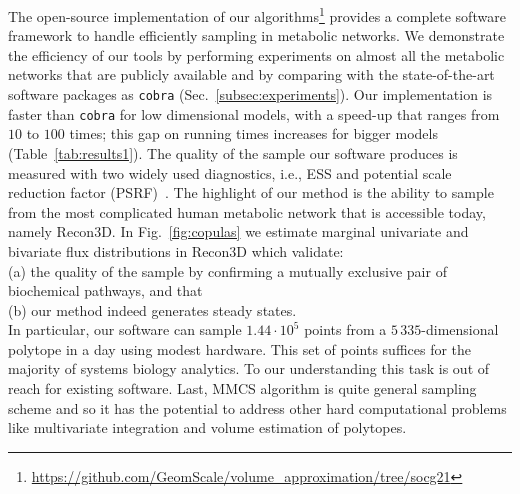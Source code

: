    The open-source implementation of our algorithms\footnote{\url{https://github.com/GeomScale/volume_approximation/tree/socg21}} provides a
   complete software framework to handle efficiently sampling in metabolic
   networks. We demonstrate the efficiency of our tools by performing experiments
   on almost all the metabolic networks that are publicly available and by
   comparing with the
   state-of-the-art software packages as \texttt{cobra}
   (Sec.~\ref{subsec:experiments}). Our implementation is faster than \texttt{cobra}
   for low dimensional models,  with a speed-up that ranges from $10$ to $100$ times;
   this gap on running times increases for bigger models
   (Table~\ref{tab:results1}). The quality of the sample our software produces is
   measured with two widely used diagnostics, i.e., ESS and potential scale reduction factor (PSRF)~\citep{Gelman92}. The highlight of
   our method is the ability to sample from the most complicated human metabolic
   network that is accessible today, namely Recon3D. In Fig.~\ref{fig:copulas} we estimate marginal univariate and bivariate flux distributions in Recon3D which validate: \\
   (a) the  quality of the sample by confirming a mutually exclusive pair of biochemical pathways,
   and that \\
   (b) our method indeed generates steady states. \\
   In particular, our software can sample $1.44\cdot 10^5$ points from a $5\,335$-dimensional polytope in a day
   using modest hardware. This set of points suffices for the majority of systems
   biology analytics.
   To our understanding this task is out of reach for existing software.
   Last, MMCS algorithm is quite general sampling scheme and
   so it has the potential to address other
   hard computational problems like  multivariate integration and volume estimation of polytopes.







